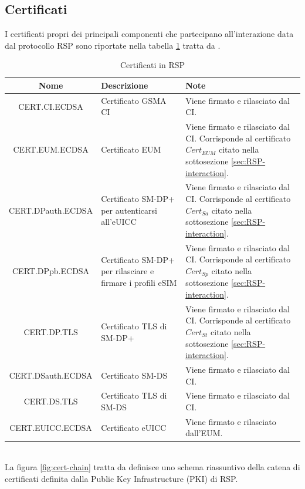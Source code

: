 \documentclass[10pt, twoside, openany]{book}
\begin{document}
\subsection{Certificati}
I certificati propri dei principali componenti che partecipano all'interazione data dal protocollo RSP sono riportate nella tabella \ref{tab:cert} tratta da \cite{GSMA-docs}.
\begin{table}[h!]
\begin{center}
\captionsetup{skip=4pt}
\caption{Certificati in RSP}
\label{tab:cert}
\begin{tabularx}{\textwidth}{|c|X|X|}
\hline
\textbf{Nome} & \textbf{Descrizione} & \textbf{Note}\\
\hline
CERT.CI.ECDSA & Certificato GSMA CI & Viene firmato e rilasciato dal CI.\\
\hline
CERT.EUM.ECDSA & Certificato EUM & Viene firmato e rilasciato dal CI. Corrisponde al certificato $Cert_{EUM}$ citato nella sottosezione \ref{sec:RSP-interaction}.\\
\hline
CERT.DPauth.ECDSA & Certificato SM-DP+ per autenticarsi all'eUICC & Viene firmato e rilasciato dal CI. Corrisponde al certificato $Cert_{Sa}$ citato nella sottosezione \ref{sec:RSP-interaction}.\\
\hline
CERT.DPpb.ECDSA & Certificato SM-DP+ per rilasciare e firmare i profili eSIM & Viene firmato e rilasciato dal CI. Corrisponde al certificato $Cert_{Sp}$ citato nella sottosezione \ref{sec:RSP-interaction}.\\
\hline
CERT.DP.TLS & Certificato TLS di SM-DP+ & Viene firmato e rilasciato dal CI. Corrisponde al certificato $Cert_{St}$ citato nella sottosezione \ref{sec:RSP-interaction}.\\
\hline
CERT.DSauth.ECDSA & Certificato SM-DS & Viene firmato e rilasciato dal CI.\\
\hline
CERT.DS.TLS & Certificato TLS di SM-DS & Viene firmato e rilasciato dal CI.\\
\hline
CERT.EUICC.ECDSA & Certificato eUICC & Viene firmato e rilasciato dall'EUM.\\
\hline
\end{tabularx}
\end{center}
\end{table}
\\La figura \ref{fig:cert-chain} tratta da \cite{GSMA-docs} definisce uno schema riassuntivo della catena di certificati definita dalla Public Key Infrastructure (PKI) di RSP.
\end{document}
